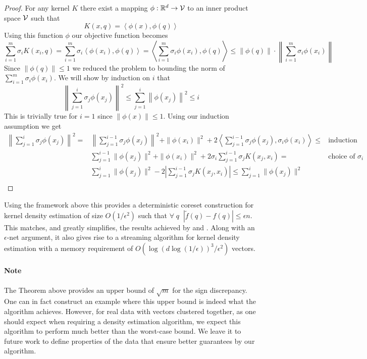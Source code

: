 \documentclass[anon,12pt]{colt2019} %
\newcommand{\ip}[1]{\left \langle #1 \right \rangle}
\newcommand{\R}{\mathbb{R}}
\newcommand{\eps}{\epsilon}
\begin{document}
\begin{proof}
For any kernel $K$ there exist a mapping $\phi: \R^d \to {\cal V}$ to an inner product space $\cal V$ such that 
$$ K(x,q) = \ip{\phi(x), \phi(q)} $$
Using this function $\phi$ our objective function becomes
\[
\sum_{i=1}^m \sigma_i K(x_i,q) = \sum_{i=1}^m \sigma_i \ip{\phi(x_i), \phi(q)} =  \ip{ \sum_{i=1}^m \sigma_i \phi(x_i), \phi(q)} \leq  \|\phi(q)\| \cdot \left\|  \sum_{i=1}^m \sigma_i \phi(x_i) \right\| 
\]
Since $\|\phi(q)\| \leq 1$ we reduced the problem to bounding the norm of $ \sum_{i=1}^m \sigma_i \phi(x_i) $.
%
We will show by induction on $i$ that 
$$\left\| \sum_{j=1}^i \sigma_j \phi(x_j) \right\|^2 \le \sum_{j=1}^i \left\|\phi(x_j)\right\|^2 \leq i$$
This is trivially true for $i=1$ since $\|\phi(x)\| \leq 1$. 
Using our induction assumption we get
\begin{eqnarray*}
\left\| \sum_{j=1}^{i}\sigma_j \phi(x_j)\right\|^2 =& \left\|\sum_{j=1}^{i-1}\sigma_j \phi(x_j)\right\|^2 + \|\phi(x_i)\|^2 + 2\ip{ \sum_{j=1}^{i-1}\sigma_j \phi(x_j), \sigma_i \phi(x_i)} \leq & \text{induction assumption}\\
& \sum_{j=1}^{i-1} \|\phi(x_j)\|^2 + \|\phi(x_i)\|^2 + 2\sigma_i \sum_{j=1}^{i-1}\sigma_j K(x_j, x_i) = & \text{choice of } \sigma_i \\
& \sum_{j=1}^{i} \|\phi(x_j)\|^2 - 2|\sum_{j=1}^{i-1}\sigma_j K(x_j, x_i)| \le \sum_{j=1}^{i} \|\phi(x_j)\|^2 \\
\end{eqnarray*}
\end{proof}

Using the framework above this provides a deterministic coreset construction for kernel density estimation of size $O(1/\eps^2)$ such that $\forall \;q\;\; |\tilde f(q) - f(q)| \le \eps n$. This matches, and greatly simplifies, the results achieved by \cite{DBLP:conf/soda/PhillipsT18} and \cite{DBLP:journals/corr/abs-1802-01751}. Along with an $\eps$-net argument, it also gives rise to a streaming algorithm for kernel density estimation with a memory requirement of $O\left(\log\left(d\log(1/\eps)\right)^3/\eps^2\right)$ vectors.

\paragraph{Note} The Theorem above provides an upper bound of $\sqrt{m}$ for the sign discrepancy. One can in fact construct an example where this upper bound is indeed what the algorithm achieves. However, for real data with vectors clustered together, as one should expect when requiring a density estimation algorithm, we expect this algorithm to perform much better than the worst-case bound. We leave it to future work to define properties of the data that ensure better guarantees by our algorithm.
\end{document}
